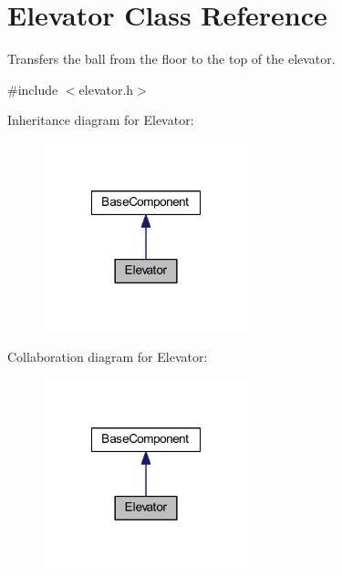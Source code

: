 \hypertarget{class_elevator}{\section{\-Elevator \-Class \-Reference}
\label{class_elevator}
}


\-Transfers the ball from the floor to the top of the elevator.  




{\ttfamily \#include $<$elevator.\-h$>$}



\-Inheritance diagram for \-Elevator\-:\nopagebreak
\begin{figure}[H]
\begin{center}
\leavevmode
\includegraphics[width=168pt]{class_elevator__inherit__graph}
\end{center}
\end{figure}


\-Collaboration diagram for \-Elevator\-:\nopagebreak
\begin{figure}[H]
\begin{center}
\leavevmode
\includegraphics[width=168pt]{class_elevator__coll__graph}
\end{center}
\end{figure}
